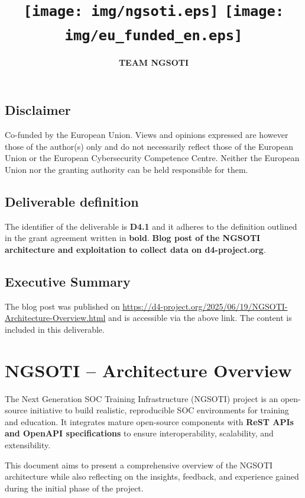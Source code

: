 \documentclass[10pt,a4paper]{report}
\title{
    \Huge \textbf{\delivtitle} \\[0.5cm]
    \texttt{[image: img/ngsoti.eps]}
    \hspace{1cm}
    \texttt{[image: img/eu\_funded\_en.eps]}
}
\author{\textbf{TEAM NGSOTI}}
\date{\delivdate}
\begin{document}
\maketitle
\thispagestyle{empty} %

\newpage
\tableofcontents
\newpage
\section*{Disclaimer}
Co-funded by the European Union. Views and opinions expressed are however
those of the author(s) only and do not necessarily reflect those of the
European Union or the European Cybersecurity Competence Centre. Neither the
European Union nor the granting authority can be held responsible for them.

\section*{Deliverable definition}
The identifier of the deliverable is \textbf{D4.1} and it adheres to the
definition outlined in the grant agreement written in \textbf{bold}.
\textbf{Blog post of the NGSOTI architecture and exploitation  to collect data
on d4-project.org}.

\section*{Executive Summary}

The blog post was published on \url{https://d4-project.org/2025/06/19/NGSOTI-Architecture-Overview.html}
and is accessible via the above link.
The content is included in this deliverable.


\chapter{NGSOTI – Architecture Overview}
The Next Generation SOC Training Infrastructure (NGSOTI) project\cite{ngsoti}
is an open-source initiative to build realistic, reproducible SOC
environments for training and education. It integrates mature open-source
components with \textbf{ReST APIs and OpenAPI specifications} to ensure
interoperability, scalability, and extensibility.

This document aims to present a comprehensive overview of the
NGSOTI architecture while also reflecting on the insights, feedback, and
experience gained during the initial phase of the project.
\end{document}
